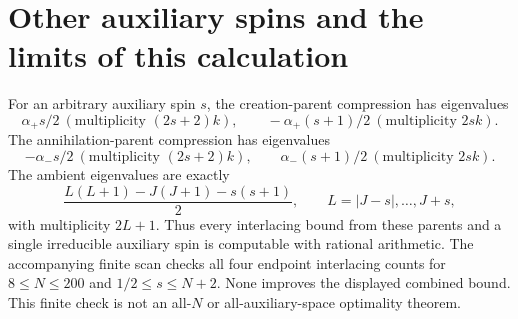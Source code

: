 \documentclass[11pt]{article}
\begin{document}
\section*{Other auxiliary spins and the limits of this calculation}
For an arbitrary auxiliary spin $s$, the creation-parent compression
has eigenvalues
\[
 \alpha_+s/2\ (\text{multiplicity }(2s+2)k),\qquad
 -\alpha_+(s+1)/2\ (\text{multiplicity }2sk).
\]
The annihilation-parent compression has eigenvalues
\[
 -\alpha_-s/2\ (\text{multiplicity }(2s+2)k),\qquad
 \alpha_-(s+1)/2\ (\text{multiplicity }2sk).
\]
The ambient eigenvalues are exactly
\[
 \frac{L(L+1)-J(J+1)-s(s+1)}2,
 \qquad L=|J-s|,\ldots,J+s,
\]
with multiplicity $2L+1$. Thus every interlacing bound from these
parents and a single irreducible auxiliary spin is computable with
rational arithmetic.
The accompanying finite scan checks all four endpoint interlacing counts
for $8\le N\le200$ and $1/2\le s\le N+2$. None improves the displayed
combined bound. This finite check is not an all-$N$ or all-auxiliary-space
optimality theorem.
\end{document}
